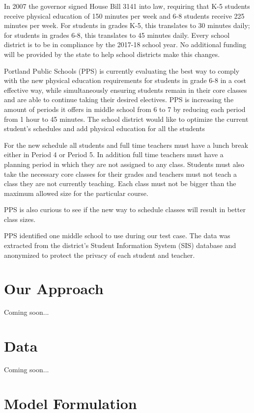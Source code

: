 \documentclass[12pt]{article}
\begin{document}
In 2007 the governor signed House Bill 3141 into law, requiring that K-5 students receive physical education of 150 minutes per week and 6-8 students receive 225 minutes per week.  For students in grades K-5, this translates to 30 minutes daily; for students in grades 6-8, this translates to 45 minutes daily. Every school district is to be in compliance by the 2017-18 school year. No additional funding will be provided by the state to help school districts make this changes.

Portland Public Schools (PPS) is currently evaluating the best way to comply with the new physical education requirements for students in grade 6-8 in a cost effective way, while simultaneously ensuring students remain in their core classes and are able to continue taking their desired electives. PPS is increasing the amount of periods it offers in middle school from 6 to 7 by reducing each period from 1 hour to 45 minutes.  The school district would like to optimize the current student’s schedules and add physical education for all the students

For the new schedule all students and full time teachers must have a lunch break either in Period 4 or Period 5. In addition full time teachers must have a planning period in which they are not assigned to any class. Students must also take the necessary core classes for their grades and teachers must not teach a class they are not currently teaching. Each class must not be bigger than the maximum allowed size for the particular course.

PPS is also curious to see if the new way to schedule classes will result in better class sizes.

PPS identified one middle school to use during our test case.  The data was extracted from the district's Student Information System (SIS) database and anonymized to protect the privacy of each student and teacher.

\section{Our Approach}

Coming soon...

\section{Data}

Coming soon...


\section{Model Formulation}
\end{document}
